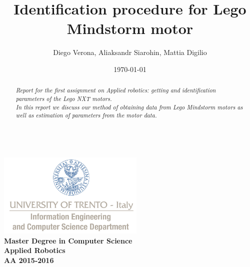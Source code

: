 \documentclass[a4paper,12pt,oneside]{article}
\title{Identification procedure for Lego Mindstorm motor}
\author{Diego Verona, Aliaksandr Siarohin, Mattia Digilio}
\date{\today}
\begin{document}
\makeatletter  %
\begin{titlepage}
      \centering
      ~~~~~~~~~~~~~\\[-30mm]
      \includegraphics[keepaspectratio=true, width=7cm]{bg_eng_1r.jpg} \\[10mm]

     {
     \large \bfseries Master Degree in Computer Science\\[3mm] 
     Applied Robotics\\[3mm]
     AA 2015-2016
     }\\[10mm]


     \vspace{0.5cm}
     {
     \Large \bfseries \textcolor{blue}{\@title} \par
     }
     \vspace{0.5cm}
     \vspace{0.2cm}

     {\large {\@author}}
     \\ \vspace{.2cm}
     \@date

     \vspace{0.6cm}


\begin{abstract}

\textit{
  Report for the first assignment on Applied robotics: getting and identification parameters of the Lego NXT motors.\\In this report we discuss our method of obtaining data from Lego Mindstorm motors as well as estimation of parameters from the motor  data.
}


\end{abstract}

\end{titlepage}
\end{document}

